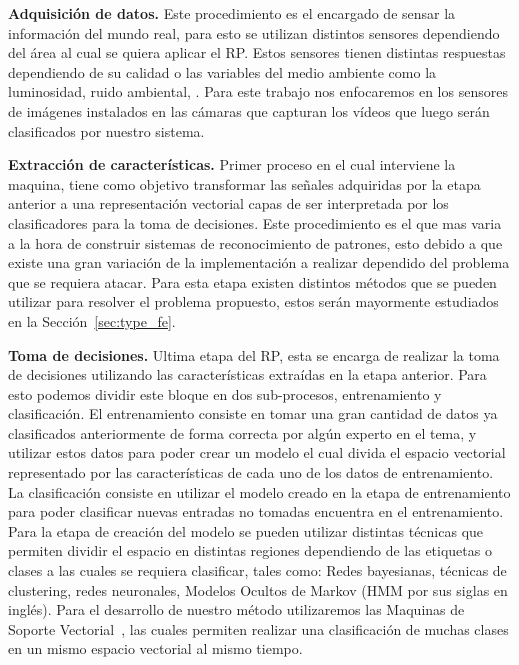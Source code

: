 	\textbf{Adquisición de datos.} Este procedimiento es el encargado de sensar la información del mundo real, para esto se utilizan distintos sensores dependiendo del área al cual se quiera aplicar el RP. Estos sensores tienen distintas respuestas dependiendo de su calidad o las variables del medio ambiente como la luminosidad, ruido ambiental, \etc. Para este trabajo nos enfocaremos en los sensores de imágenes instalados en las cámaras que capturan los vídeos que luego serán clasificados por nuestro sistema.
	
	\textbf{Extracción de características.} Primer proceso en el cual interviene la maquina, tiene como objetivo transformar las señales adquiridas por la etapa anterior a una representación vectorial capas de ser interpretada por los clasificadores para la toma de decisiones. Este procedimiento es el que mas varia a la hora de construir sistemas de reconocimiento de patrones, esto debido a que existe una gran variación de la implementación a realizar dependido del problema que se requiera atacar. Para esta etapa existen distintos métodos que se pueden utilizar para resolver el problema propuesto, estos serán mayormente estudiados en la Sección~\ref{sec:type_fe}.
	
	\textbf{Toma de decisiones.} Ultima etapa del RP, esta se encarga de realizar la toma de decisiones utilizando las características extraídas en la etapa anterior. Para esto podemos dividir este bloque en dos sub-procesos, entrenamiento y clasificación. El entrenamiento consiste en tomar una gran cantidad de datos ya clasificados anteriormente de forma correcta por algún experto en el tema, y utilizar estos datos para poder crear un modelo el cual divida el espacio vectorial representado por las características de cada uno de los datos de entrenamiento. La clasificación consiste en utilizar el modelo creado en la etapa de entrenamiento para poder clasificar nuevas entradas no tomadas encuentra en el entrenamiento. Para la etapa de creación del modelo se pueden utilizar distintas técnicas que permiten dividir el espacio en distintas regiones dependiendo de las etiquetas o clases a las cuales se requiera clasificar, tales como: Redes bayesianas, técnicas de clustering, redes neuronales, Modelos Ocultos de Markov (HMM por sus siglas en inglés). Para el desarrollo de nuestro método utilizaremos las Maquinas de Soporte Vectorial~\cite{Cortes1995,Hearst1998}, las cuales permiten realizar una clasificación de muchas clases en un mismo espacio vectorial al mismo tiempo. 


